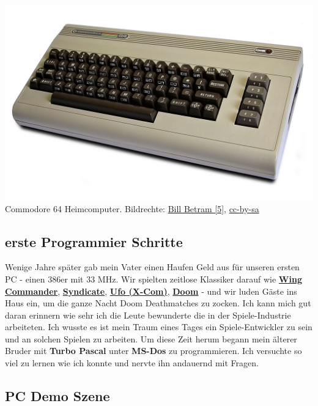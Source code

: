 \documentclass[10pt,a4paper,ngerman,twoside]{article} %
\begin{document}
\begin{multicols}{3}
\begin{center}
\includegraphics[width=0.9\linewidth]{austrianguy/austrianguy-c64.jpg}\\
\footnotesize{Commodore 64 Heimcomputer. Bildrechte: \href{https://commons.wikimedia.org/wiki/File:Commodore64.jpg}{Bill Betram [5]}, \href{https://creativecommons.org/licenses/by-sa/2.5/deed.en}{cc-by-sa}}
\end{center}

\subsection*{erste Programmier Schritte}

Wenige Jahre später gab mein Vater einen Haufen Geld aus für unseren ersten PC - einen 386er mit 33 MHz. Wir spielten zeitlose Klassiker darauf wie \href{https://de.wikipedia.org/wiki/Wing_Commander_(Computerspiel)}{\textbf{Wing Commander}}, \href{https://de.wikipedia.org/wiki/Syndicate}{\textbf{Syndicate}}, \href{https://de.wikipedia.org/wiki/X-COM}{\textbf{Ufo (X-Com)}}, \href{https://de.wikipedia.org/wiki/Doom}{\textbf{Doom}} - und wir luden Gäste ins Haus ein, um die ganze Nacht Doom Deathmatches zu zocken. Ich kann mich gut daran erinnern wie sehr ich die Leute bewunderte die in der Spiele-Industrie arbeiteten. Ich wusste es ist mein Traum eines Tages ein Spiele-Entwickler zu sein und an solchen Spielen zu arbeiten. Um diese Zeit herum begann mein älterer Bruder mit \textbf{Turbo Pascal} unter \textbf{MS-Dos} zu programmieren. Ich versuchte so viel zu lernen wie ich konnte und nervte ihn andauernd mit Fragen.

\subsection*{PC Demo Szene}


\end{multicols}
\end{document}
